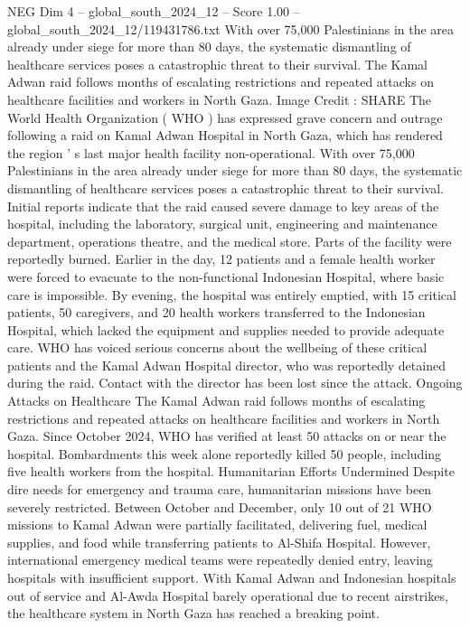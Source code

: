 \begin{textsample}{NEG Dim 4 – global\_south\_2024\_12 – Score 1.00 – global\_south\_2024\_12/119431786.txt}  \label{ex:f4_neg_228}
With over 75,000 Palestinians in the area already under siege for more than 80 days, the systematic dismantling of healthcare services poses a catastrophic threat to their survival.
The Kamal Adwan raid follows months of escalating restrictions and repeated attacks on healthcare facilities and workers in North Gaza.
Image Credit : SHARE The World Health Organization ( WHO ) has expressed grave concern and outrage following a raid on Kamal Adwan Hospital in North Gaza, which has rendered the region ' s last major health facility non-operational.
With over 75,000 Palestinians in the area already under siege for more than 80 days, the systematic dismantling of healthcare services poses a catastrophic threat to their survival.
Initial reports indicate that the raid caused severe damage to key areas of the hospital, including the laboratory, surgical unit, engineering and maintenance department, operations theatre, and the medical store.
Parts of the facility were reportedly burned.
Earlier in the day, 12 patients and a female health worker were forced to evacuate to the non-functional Indonesian Hospital, where basic care is impossible.
By evening, the hospital was entirely emptied, with 15 critical patients, 50 caregivers, and 20 health workers transferred to the Indonesian Hospital, which lacked the equipment and supplies needed to provide adequate care.
WHO has voiced serious concerns about the wellbeing of these critical patients and the Kamal Adwan Hospital director, who was reportedly detained during the raid.
Contact with the director has been lost since the attack.
Ongoing Attacks on Healthcare The Kamal Adwan raid follows months of escalating restrictions and repeated attacks on healthcare facilities and workers in North Gaza.
Since October 2024, WHO has verified at least 50 attacks on or near the hospital.
Bombardments this week alone reportedly killed 50 people, including five health workers from the hospital.
Humanitarian Efforts Undermined Despite dire needs for emergency and trauma care, humanitarian missions have been severely restricted.
Between October and December, only 10 out of 21 WHO missions to Kamal Adwan were partially facilitated, delivering fuel, medical supplies, and food while transferring patients to Al-Shifa Hospital.
However, international emergency medical teams were repeatedly denied entry, leaving hospitals with insufficient support.
With Kamal Adwan and Indonesian hospitals out of service and Al-Awda Hospital barely operational due to recent airstrikes, the healthcare system in North Gaza has reached a breaking point.

\end{textsample}

